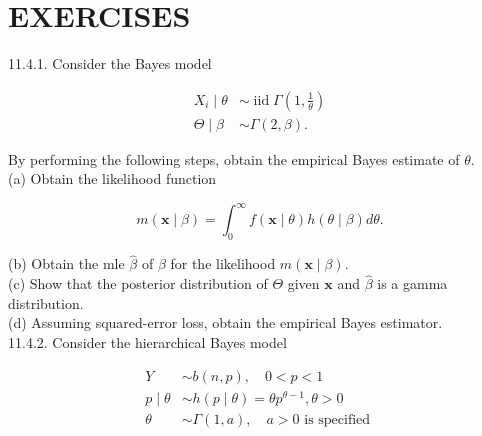 \section*{EXERCISES}
11.4.1. Consider the Bayes model

$$
\begin{aligned}
X_{i} \mid \theta & \sim \operatorname{iid} \Gamma\left(1, \frac{1}{\theta}\right) \\
\Theta \mid \beta & \sim \Gamma(2, \beta) .
\end{aligned}
$$

By performing the following steps, obtain the empirical Bayes estimate of $\theta$.\\
(a) Obtain the likelihood function

$$
m(\mathbf{x} \mid \beta)=\int_{0}^{\infty} f(\mathbf{x} \mid \theta) h(\theta \mid \beta) d \theta .
$$

(b) Obtain the mle $\widehat{\beta}$ of $\beta$ for the likelihood $m(\mathbf{x} \mid \beta)$.\\
(c) Show that the posterior distribution of $\Theta$ given $\mathbf{x}$ and $\widehat{\beta}$ is a gamma distribution.\\
(d) Assuming squared-error loss, obtain the empirical Bayes estimator.\\
11.4.2. Consider the hierarchical Bayes model


\begin{align*}
Y & \sim b(n, p), \quad 0<p<1 \\
p \mid \theta & \sim h(p \mid \theta)=\theta p^{\theta-1}, \theta>0 \\
\theta & \sim \Gamma(1, a), \quad a>0 \text { is specified } \tag{11.4.17}
\end{align*}


